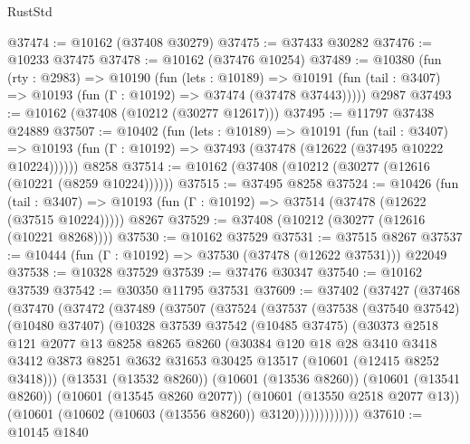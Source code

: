 \begin{lexlean}{RustStd}
\begin{coremodule}
@37474 := @10162 (@37408 @30279)
@37475 := @37433 @30282
@37476 := @10233 @37475
@37478 := @10162 (@37476 @10254)
@37489 := @10380
    (fun (rty : @2983) =>
    @10190
      (fun (lets : @10189) =>
      @10191 (fun (tail : @3407) => @10193 (fun (Γ : @10192) => @37474 (@37478 @37443)))))
    @2987
@37493 := @10162 (@37408 (@10212 (@30277 @12617)))
@37495 := @11797 @37438 @24889
@37507 := @10402
    (fun (lets : @10189) =>
    @10191
      (fun (tail : @3407) =>
      @10193 (fun (Γ : @10192) => @37493 (@37478 (@12622 (@37495 @10222 @10224))))))
    @8258
@37514 := @10162 (@37408 (@10212 (@30277 (@12616 (@10221 (@8259 @10224))))))
@37515 := @37495 @8258
@37524 := @10426
    (fun (tail : @3407) => @10193 (fun (Γ : @10192) => @37514 (@37478 (@12622 (@37515 @10224)))))
    @8267
@37529 := @37408 (@10212 (@30277 (@12616 (@10221 @8268))))
@37530 := @10162 @37529
@37531 := @37515 @8267
@37537 := @10444 (fun (Γ : @10192) => @37530 (@37478 (@12622 @37531))) @22049
@37538 := @10328 @37529
@37539 := @37476 @30347
@37540 := @10162 @37539
@37542 := @30350 @11795 @37531
@37609 := @37402
    (@37427
      (@37468
        (@37470
          (@37472
            (@37489
              (@37507
                (@37524
                  (@37537
                    (@37538
                      (@37540 @37542)
                      (@10480 @37407)
                      (@10328
                        @37539
                        @37542
                        (@10485 @37475)
                        (@30373
                          @2518
                          @121
                          @2077
                          @13
                          @8258
                          @8265
                          @8260
                          (@30384
                            @120
                            @18
                            @28
                            @3410
                            @3418
                            @3412
                            @3873
                            @8251
                            @3632
                            @31653
                            @30425
                            @13517
                            (@10601 (@12415 @8252 @3418)))
                          (@13531 (@13532 @8260))
                          (@10601 (@13536 @8260))
                          (@10601 (@13541 @8260))
                          (@10601 (@13545 @8260 @2077))
                          (@10601 (@13550 @2518 @2077 @13))
                          (@10601 (@10602 (@10603 (@13556 @8260)) @3120)))))))))))))
@37610 := @10145 @1840

\end{coremodule}
\end{lexlean}
